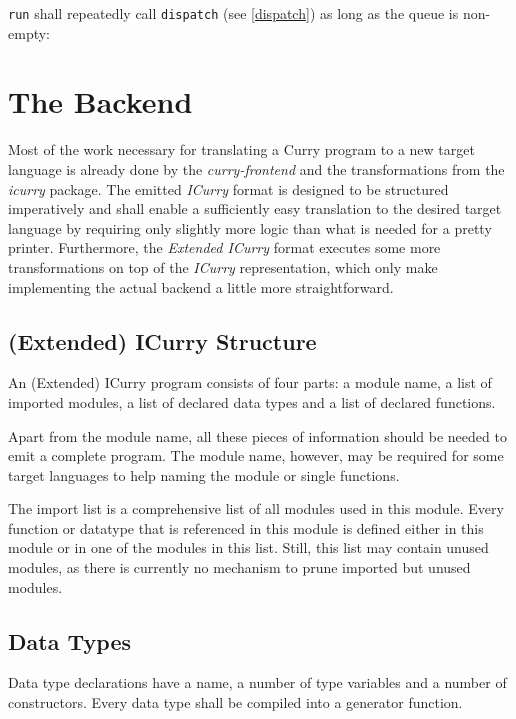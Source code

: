 \texttt{run} shall repeatedly call \texttt{dispatch} (see \ref{dispatch}) as long as the queue is non-empty:

\begin{algorithm}[H]
\end{algorithm}

\section{The Backend}

Most of the work necessary for translating a Curry program to a new target language is already done by the \emph{curry-frontend} and the transformations from the \emph{icurry} package.
The emitted \emph{ICurry} format is designed to be structured imperatively and shall enable a sufficiently easy translation to the desired target language by requiring only slightly more logic than what is needed for a pretty printer.
Furthermore, the \emph{Extended ICurry} format executes some more transformations on top of the \emph{ICurry} representation, which only make implementing the actual backend a little more straightforward.

\subsection{(Extended) ICurry Structure}

An (Extended) ICurry program consists of four parts: a module name, a list of imported modules, a list of declared data types and a list of declared functions.

Apart from the module name, all these pieces of information should be needed to emit a complete program.
The module name, however, may be required for some target languages to help naming the module or single functions.

The import list is a comprehensive list of all modules used in this module.
Every function or datatype that is referenced in this module is defined either in this module or in one of the modules in this list.
Still, this list may contain unused modules, as there is currently no mechanism to prune imported but unused modules.


\subsection{Data Types}

Data type declarations have a name, a number of type variables and a number of constructors.
Every data type shall be compiled into a generator function.

